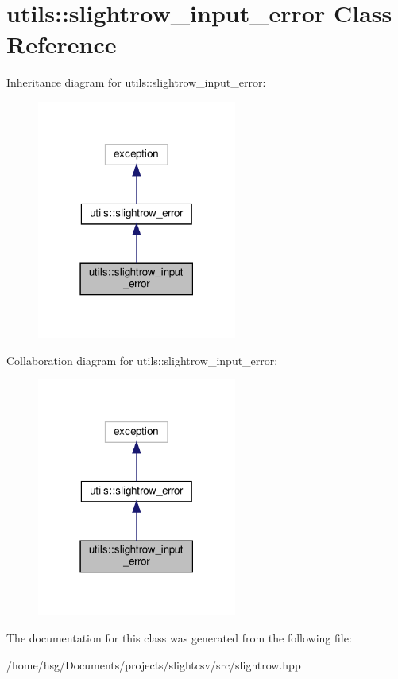 \hypertarget{classutils_1_1slightrow__input__error}{}\section{utils\+:\+:slightrow\+\_\+input\+\_\+error Class Reference}
\label{classutils_1_1slightrow__input__error}


Inheritance diagram for utils\+:\+:slightrow\+\_\+input\+\_\+error\+:\nopagebreak
\begin{figure}[H]
\begin{center}
\leavevmode
\includegraphics[width=186pt]{classutils_1_1slightrow__input__error__inherit__graph}
\end{center}
\end{figure}


Collaboration diagram for utils\+:\+:slightrow\+\_\+input\+\_\+error\+:\nopagebreak
\begin{figure}[H]
\begin{center}
\leavevmode
\includegraphics[width=186pt]{classutils_1_1slightrow__input__error__coll__graph}
\end{center}
\end{figure}


The documentation for this class was generated from the following file\+:\begin{DoxyCompactItemize}
\item 
/home/hsg/\+Documents/projects/slightcsv/src/slightrow.\+hpp\end{DoxyCompactItemize}

